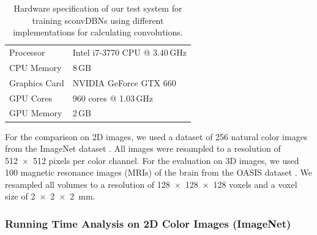\begin{table} 
\centering
\caption{Hardware specification of our test system for training sconvDBNs using
different implementations for calculating convolutions.}
\label{tab:hardware1}
\begin{tabular} {ll}
\toprule
Processor & Intel i7-3770 CPU @ 3.40\,GHz \\
CPU Memory & 8\,GB \\
\addlinespace
Graphics Card & NVIDIA GeForce GTX 660 \\
GPU Cores & 960 cores @ 1.03\,GHz \\
GPU Memory & 2\,GB \\
\bottomrule
\end{tabular}
\end{table}

For the comparison on 2D images, we used a dataset of 256 natural color images
from the ImageNet dataset \citep{deng2009}. All images were resampled to a
resolution of \num{512x512} pixels per color channel. For the evaluation on 3D
images, we used 100 magnetic resonance images (MRIs) of the brain from the OASIS
dataset \citep{marcus2007}. We resampled all volumes to a resolution of
\num{128x128x128} voxels and a voxel size of \SI{2x2x2}{\milli\metre}.

\subsubsection{Running Time Analysis on 2D Color Images (ImageNet)}

